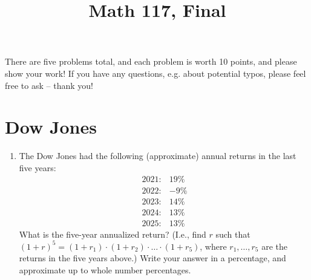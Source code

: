\documentclass[12pt,reqno]{amsart}
\title{\Large Math 117, Final \vspace{-0.1cm}}
\theoremstyle{definition}
\theoremstyle{remark}
\numberwithin{equation}{section}
\newenvironment{nouppercase}{%
  \let\uppercase\relax%
  \renewcommand{\uppercasenonmath}[1]{}}{}
\begin{document}
\begin{nouppercase}
\maketitle
\end{nouppercase}

There are five problems total, and each problem is worth 10 points, {\color{red}and please show your work!} If you have any questions, e.g. about potential typos, please feel free to ask -- thank you!


\section{Dow Jones}
\begin{enumerate}
\item The Dow Jones had the following (approximate) annual returns in the last five years:
%
\begin{align*}
2021: &19\%\\
2022: &-9\%\\
2023: &14\%\\
2024: &13\%\\
2025: &13\%
\end{align*}
%
What is the five-year annualized return? (I.e., find $r$ such that $(1+r)^{5}=(1+r_{1})\cdot(1+r_{2})\cdot\ldots\cdot(1+r_{5})$, where $r_{1},\ldots,r_{5}$ are the returns in the five years above.) Write your answer in a percentage, and approximate up to whole number percentages.
\end{enumerate}



\newpage

\end{document}
